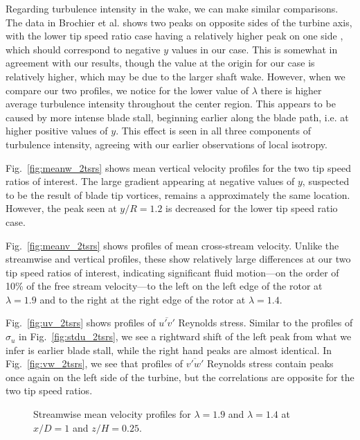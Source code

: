 Regarding turbulence intensity in the wake, we can make similar comparisons. The
data in Brochier et al. shows two peaks on opposite sides of the turbine axis,
with the lower tip speed ratio case having a relatively higher peak on one side
\cite{brochier86}, which should correspond to negative $y$ values in our case.
This is somewhat in agreement with our results, though the value at the origin
for our case is relatively higher, which may be due to the larger shaft wake.
However, when we compare our two profiles, we notice for the lower value of
$\lambda$ there is higher average turbulence intensity throughout the center
region. This appears to be caused by more intense blade stall, beginning earlier
along the blade path, i.e. at higher positive values of $y$. This effect is seen
in all three components of turbulence intensity, agreeing with our earlier
observations of local isotropy.

Fig.~\ref{fig:meanw_2tsrs} shows mean vertical velocity profiles for the two tip
speed ratios of interest. The large gradient appearing at negative values of
$y$, suspected to be the result of blade tip vortices, remains a approximately
the same location. However, the peak seen at $y/R = 1.2$ is decreased for the
lower tip speed ratio case.

Fig.~\ref{fig:meanv_2tsrs} shows profiles of mean cross-stream velocity. Unlike
the streamwise and vertical profiles, these show relatively large differences at
our two tip speed ratios of interest, indicating significant fluid motion---on
the order of 10\% of the free stream velocity---to the left on the left edge of
the rotor at $\lambda=1.9$ and to the right at the right edge of the rotor at
$\lambda = 1.4$.

Fig.~\ref{fig:uv_2tsrs} shows profiles of $\overline{u'v'}$ Reynolds stress.
Similar to the profiles of $\sigma_u$ in Fig.~\ref{fig:stdu_2tsrs}, we see a
rightward shift of the left peak from what we infer is earlier blade stall,
while the right hand peaks are almost identical. In Fig.~\ref{fig:vw_2tsrs}, we
see that profiles of $\overline{v'w'}$ Reynolds stress contain peaks once again
on the left side of the turbine, but the correlations are opposite for the two
tip speed ratios.

\begin{figure}[t]

    \caption{Streamwise mean velocity profiles for $\lambda = 1.9$ and
        $\lambda=1.4$ at $x/D=1$ and $z/H = 0.25$.}

    \label{fig:meanu_2tsrs} 
\end{figure}

